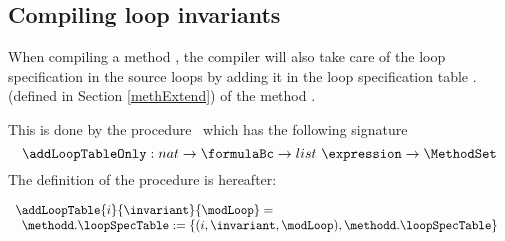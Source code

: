 \subsection{Compiling loop invariants}\label{pogEq:compile:loopInv}
When compiling a method \methodd,
the compiler will also take care of the loop specification in the source loops
by adding it in the loop specification table \methodd.\loopSpecTable (defined in Section \ref{methExtend}) of the method \methodd.

This is done by the procedure  \addLoopTableOnly \ which has the following signature
$$ \addLoopTableOnly : nat \rightarrow  \formulaBc  \rightarrow  list \ \expression \rightarrow \MethodSet $$
The definition of the procedure is hereafter:


$$ \begin{array}{l}
  \addLoopTable{ i }{ \invariant  }{ \modLoop} = \\
   \begin{array}{l}
         \methodd.\loopSpecTable := \{ (i,\invariant , \modLoop  ) , \methodd.\loopSpecTable \}

   \end{array}
\end{array}$$

